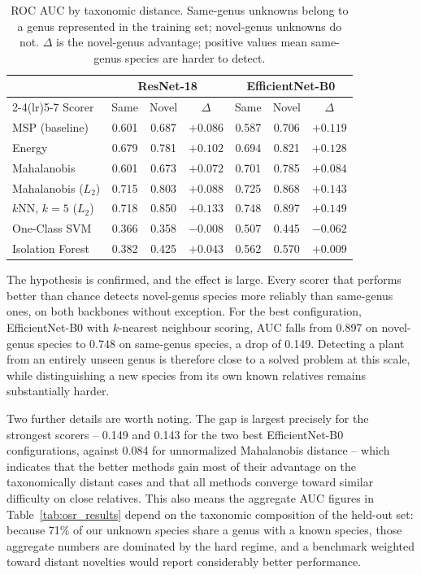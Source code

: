 \documentclass[11pt]{article}
\begin{document}
\begin{table}[H]
\centering
\caption{ROC AUC by taxonomic distance. Same-genus unknowns belong to a genus represented in the training set; novel-genus unknowns do not. $\Delta$ is the novel-genus advantage; positive values mean same-genus species are harder to detect.}
\label{tab:taxonomy}

\begin{tabular}{lccc@{\hspace{1.2em}}ccc}
\toprule
& \multicolumn{3}{c}{ResNet-18} & \multicolumn{3}{c}{EfficientNet-B0} \\
\cmidrule(lr){2-4}\cmidrule(lr){5-7}
Scorer & Same & Novel & $\Delta$ & Same & Novel & $\Delta$ \\
\midrule
MSP (baseline)         & 0.601 & 0.687 & $+0.086$ & 0.587 & 0.706 & $+0.119$ \\
Energy                 & 0.679 & 0.781 & $+0.102$ & 0.694 & 0.821 & $+0.128$ \\
Mahalanobis            & 0.601 & 0.673 & $+0.072$ & 0.701 & 0.785 & $+0.084$ \\
Mahalanobis ($L_2$)    & 0.715 & 0.803 & $+0.088$ & 0.725 & 0.868 & $+0.143$ \\
$k$NN, $k{=}5$ ($L_2$) & 0.718 & 0.850 & $+0.133$ & 0.748 & 0.897 & $+0.149$ \\
One-Class SVM          & 0.366 & 0.358 & $-0.008$ & 0.507 & 0.445 & $-0.062$ \\
Isolation Forest       & 0.382 & 0.425 & $+0.043$ & 0.562 & 0.570 & $+0.009$ \\
\bottomrule
\end{tabular}
\end{table}

The hypothesis is confirmed, and the effect is large. Every scorer that performs better than chance detects novel-genus species more reliably than same-genus ones, on both backbones without exception. For the best configuration, EfficientNet-B0 with $k$-nearest neighbour scoring, AUC falls from 0.897 on novel-genus species to 0.748 on same-genus species, a drop of 0.149. Detecting a plant from an entirely unseen genus is therefore close to a solved problem at this scale, while distinguishing a new species from its own known relatives remains substantially harder.

Two further details are worth noting. The gap is largest precisely for the strongest scorers -- 0.149 and 0.143 for the two best EfficientNet-B0 configurations, against 0.084 for unnormalized Mahalanobis distance -- which indicates that the better methods gain most of their advantage on the taxonomically distant cases and that all methods converge toward similar difficulty on close relatives. This also means the aggregate AUC figures in Table~\ref{tab:osr_results} depend on the taxonomic composition of the held-out set: because 71\% of our unknown species share a genus with a known species, those aggregate numbers are dominated by the hard regime, and a benchmark weighted toward distant novelties would report considerably better performance.
\end{document}
